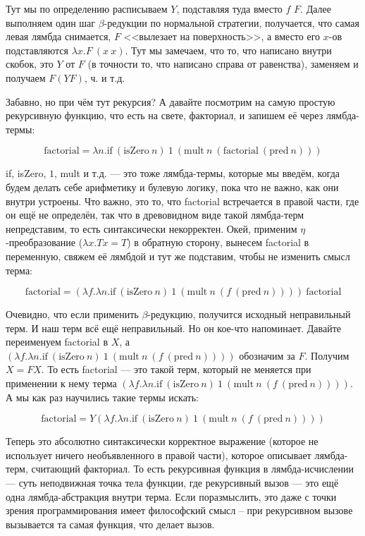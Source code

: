 \documentclass[a5paper]{article}
\begin{document}
Тут мы по определению расписываем $Y$, подставляя туда вместо $f$ $F$. Далее выполняем один шаг $\beta$-редукции по нормальной стратегии, получается, что самая левая лямбда снимается, $F$ <<вылезает на поверхность>>, а вместо его $x$-ов подставляются $\lambda x.F\ (x\ x)$. Тут мы замечаем, что то, что написано внутри скобок, это $Y$ от $F$ (в точности то, что написано справа от равенства), заменяем и получаем $F (Y F)$, ч. и т.д.

Забавно, но при чём тут рекурсия? А давайте посмотрим на самую простую рекурсивную функцию, что есть на свете, факториал, и запишем её через лямбда-термы:

$$\mbox{factorial} = \lambda n. \mbox{if}\ (\mbox{isZero}\ n)\ 1\ (\mbox{mult}\ n\ (\mbox{factorial}\ (\mbox{pred}\ n)))$$

if, isZero, $1$, mult и т.д. --- это тоже лямбда-термы, которые мы введём, когда будем делать себе арифметику и булевую логику, пока что не важно, как они внутри устроены. Что важно, это то, что factorial встречается в правой части, где он ещё не определён, так что в древовидном виде такой лямбда-терм непредставим, то есть синтаксически некорректен. Окей, применим $\eta$-преобразование ($\lambda x. T x = T$) в обратную сторону, вынесем factorial в переменную, свяжем её лямбдой и тут же подставим, чтобы не изменить смысл терма:

$$\mbox{factorial} = (\lambda f.\lambda n.\mbox{if}\ (\mbox{isZero}\ n)\ 1\ (\mbox{mult}\ n\ (f\ (\mbox{pred}\ n))))\ \mbox{factorial}$$

Очевидно, что если применить $\beta$-редукцию, получится исходный неправильный терм. И наш терм всё ещё неправильный. Но он кое-что напоминает. Давайте переименуем factorial в $X$, а $(\lambda f.\lambda n.\mbox{if}\ (\mbox{isZero}\ n)\ 1\ (\mbox{mult}\ n\ (f\ (\mbox{pred}\ n))))$ обозначим за $F$. Получим $X = F X$. То есть factorial --- это такой терм, который не меняется при применении к нему терма $(\lambda f.\lambda n.\mbox{if}\ (\mbox{isZero}\ n)\ 1\ (\mbox{mult}\ n\ (f\ (\mbox{pred}\ n))))$. А мы как раз научились такие термы искать:

$$\mbox{factorial} = Y (\lambda f.\lambda n.\mbox{if}\ (\mbox{isZero}\ n)\ 1\ (\mbox{mult}\ n\ (f\ (\mbox{pred}\ n))))$$

Теперь это абсолютно синтаксически корректное выражение (которое не использует ничего необъявленного в правой части), которое описывает лямбда-терм, считающий факториал. То есть рекурсивная функция в лямбда-исчислении --- суть неподвижная точка тела функции, где рекурсивный вызов --- это ещё одна лямбда-абстракция внутри терма. Если поразмыслить, это даже с точки зрения программирования имеет философский смысл -- при рекурсивном вызове вызывается та самая функция, что делает вызов.
\end{document}
